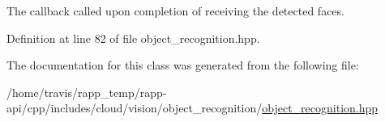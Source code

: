 The callback called upon completion of receiving the detected faces. 



Definition at line 82 of file object\-\_\-recognition.\-hpp.



The documentation for this class was generated from the following file\-:\begin{DoxyCompactItemize}
\item 
/home/travis/rapp\-\_\-temp/rapp-\/api/cpp/includes/cloud/vision/object\-\_\-recognition/\hyperlink{object__recognition_8hpp}{object\-\_\-recognition.\-hpp}\end{DoxyCompactItemize}
